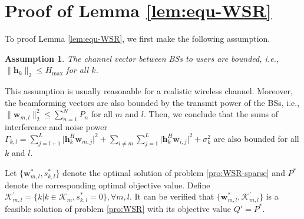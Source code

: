 \documentclass[12pt, draftclsnofoot, onecolumn]{IEEEtran}
\newtheorem{assumption}{Assumption}
\begin{document}




\appendices
\section{Proof of Lemma \ref{lem:equ-WSR}} \label{app:proof-of-lemma-equ-WSR}
To proof Lemma \ref{lem:equ-WSR}, we first make the following assumption.
\begin{assumption}
The channel vector between BSs to users are bounded, i.e., $\lVert \mathbf{h}_k \rVert_2 \leq H_{\text{max}}$ for all $k$.
\end{assumption}

This assumption is usually reasonable for a realistic wireless channel. Moreover, the beamforming vectors are also bounded by the transmit power of the BSs, i.e., $\lVert \mathbf{w}_{m,l} \rVert_2^2 \leq \sum_{n=1}^N P_n$ for all $m$ and $l$. Then, we conclude that the sums of interference and noise power $\Gamma_{k,l} = \sum_{j = l+1}^L \lvert \mathbf{h}_k^H \mathbf{w}_{m,j} \rvert^2 + \sum_{i \neq m} \sum_{j = 1}^L \lvert \mathbf{h}_k^H \mathbf{w}_{i,j} \rvert^2 + \sigma_k^2$ are also bounded for all $k$ and $l$.


Let $\{\mathbf{w}_{m,l}^*, s_{k,l}^*\}$ denote the optimal solution of problem \eqref{pro:WSR-sparse} and $P^*$ denote the corresponding optimal objective value. Define $\mathcal{K}_{m,l}^{'} = \{k | k \in \mathcal{K}_m, s_{k,l}^* = 0 \}, \forall m, l$. It can be verified that $\{\mathbf{w}_{m,l}^*, \mathcal{K}_{m,l}^{'}\}$ is a feasible solution of problem \eqref{pro:WSR} with its objective value $Q' = P^*$.
\end{document}
